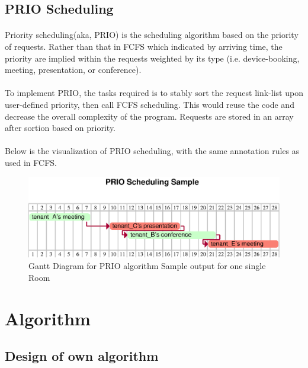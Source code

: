 \documentclass{article}
\begin{document}
        \subsection{PRIO Scheduling}
            \paragraph{}
            Priority scheduling(aka, PRIO) is the scheduling algorithm based on the
                priority of requests. Rather than that in FCFS which indicated by arriving time, the priority are implied within the requests weighted by its type (i.e. device-booking, meeting, presentation, or conference). 
            \paragraph{}
            To implement PRIO, the tasks required is to stably sort the request link-list upon user-defined priority, then call FCFS scheduling. This would reuse the code and decrease the overall complexity of the program.
                Requests are stored in an array after sortion based on priority. 
            \paragraph{}
            Below is the visualization of PRIO scheduling, with the same annotation rules as used in FCFS.
            \begin{figure}[!htbp]
                \centering
                \includegraphics[scale=0.7]{../res/eps/prio_scheduling.eps}
                \caption{Gantt Diagram for PRIO algorithm Sample output for one single Room}
            \end{figure}
    \cleardoublepage
    \section{Algorithm}
    \subsection{Design of own algorithm }
\end{document}
